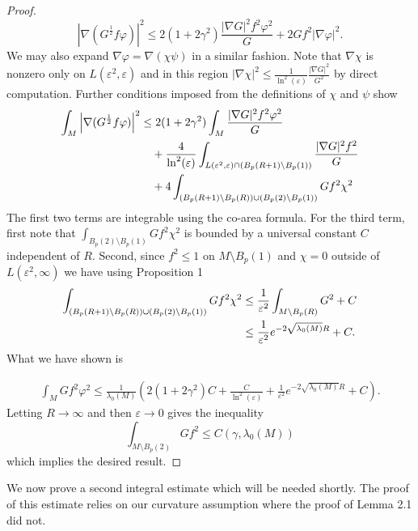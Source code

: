 \documentclass{amsart}
\theoremstyle{definition}
\theoremstyle{remark}
\numberwithin{equation}{section}
\begin{document}
\begin{proof}
\begin{equation*}
\left|\nabla\left(G^\frac{1}{2}f\varphi\right)\right|^2\leq 2(1+2\gamma^2)\frac{|\nabla G|^2f^2\varphi^2}{G}+2Gf^2|\nabla\varphi|^2.
\end{equation*}
We may also expand $\nabla\varphi = \nabla(\chi\psi)$ in a similar fashion. Note that $\nabla\chi$ is nonzero only on $L(\varepsilon^2,\varepsilon)$ and in this region $|\nabla\chi|^2\leq \frac{1}{\ln^2(\varepsilon)}\frac{|\nabla G|^2}{G^2}$ by direct computation. Further conditions imposed from the definitions of $\chi$ and $\psi$ show
\begin{align}
\int_M \left| \nabla(G^{\frac{1}{2}} f \varphi) \right|^2 
&\leq 2(1 + 2\gamma^2) \int_M \frac{|\nabla G|^2 f^2 \varphi^2}{G} \notag \\
&\quad + \frac{4}{\ln^2(\varepsilon)} \int_{L(\varepsilon^2, \varepsilon) \cap (B_p(R+1)\setminus B_p(1))} \frac{|\nabla G|^2 f^2}{G}\notag  \\
&\quad + 4 \int_{(B_p(R+1)\setminus B_p(R)) \cup (B_p(2)\setminus B_p(1))} G f^2 \chi^2 \notag
\end{align}
The first two terms are integrable using the co-area formula. For the third term, first note that $\int_{B_p(2)\setminus B_p(1)} Gf^2\chi^2$ is bounded by a universal constant $C$ independent of $R$. Second, since $f^2\leq 1$ on $M\setminus B_p(1)$ and $\chi = 0$ outside of $L(\varepsilon^2,\infty)$ we have using Proposition 1
\begin{align*}
\int_{(B_p(R+1)\setminus B_p(R))\cup (B_p(2)\setminus B_p(1))} Gf^2\chi^2 
&\leq \frac{1}{\varepsilon^2}\int_{M\setminus B_p(R)} G^2 + C \notag \\
&\leq \frac{1}{\varepsilon^2}e^{-2\sqrt{\lambda_0(M)}R}+C.
\end{align*}
What we have shown is

\begin{align*}
\int_M Gf^2\varphi^2\leq \frac{1}{\lambda_0(M)}\left(2(1+2\gamma^2)C+\frac{C}{\ln^2(\varepsilon)}+\frac{1}{\varepsilon^2}e^{-2\sqrt{\lambda_0(M)}R}+C\right).
\end{align*}
Letting $R\to\infty$ and then $\varepsilon\to 0$ gives the inequality
\begin{equation*}
\int_{M\setminus B_p(2)} Gf^2\leq C(\gamma,\lambda_0(M))
\end{equation*}
which implies the desired result.
\end{proof}

We now prove a second integral estimate which will be needed shortly. The proof of this estimate relies on our curvature assumption where the proof of Lemma 2.1 did not.
\end{document}
